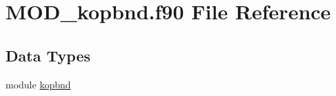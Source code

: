 \hypertarget{MOD__kopbnd_8f90}{\section{M\-O\-D\-\_\-kopbnd.\-f90 File Reference}
\label{MOD__kopbnd_8f90}
}
\subsection*{Data Types}
\begin{DoxyCompactItemize}
\item 
module \hyperlink{classkopbnd}{kopbnd}
\end{DoxyCompactItemize}
